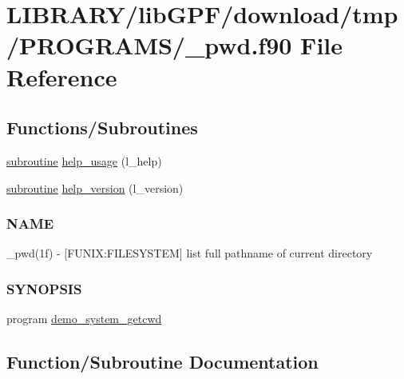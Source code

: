 \hypertarget{__pwd_8f90}{}\section{L\+I\+B\+R\+A\+R\+Y/lib\+G\+P\+F/download/tmp/\+P\+R\+O\+G\+R\+A\+M\+S/\+\_\+pwd.f90 File Reference}
\label{__pwd_8f90}
\subsection*{Functions/\+Subroutines}
\begin{DoxyCompactItemize}
\item 
\hyperlink{M__stopwatch_83_8txt_acfbcff50169d691ff02d4a123ed70482}{subroutine} \hyperlink{__pwd_8f90_a3e09a3b52ee8fb04eeb93fe5761626a8}{help\+\_\+usage} (l\+\_\+help)
\item 
\hyperlink{M__stopwatch_83_8txt_acfbcff50169d691ff02d4a123ed70482}{subroutine} \hyperlink{__pwd_8f90_a39c21619b08a3c22f19e2306efd7f766}{help\+\_\+version} (l\+\_\+version)
\begin{DoxyCompactList}\small\item\em \subsubsection*{N\+A\+ME}

\+\_\+pwd(1f) -\/ \mbox{[}F\+U\+N\+IX\+:F\+I\+L\+E\+S\+Y\+S\+T\+EM\mbox{]} list full pathname of current directory \subsubsection*{S\+Y\+N\+O\+P\+S\+IS}\end{DoxyCompactList}\item 
program \hyperlink{__pwd_8f90_a64555eabda1ed68b752904f9cbc26868}{demo\+\_\+system\+\_\+getcwd}
\end{DoxyCompactItemize}


\subsection{Function/\+Subroutine Documentation}
\mbox{\label{__pwd_8f90_a64555eabda1ed68b752904f9cbc26868}} 
